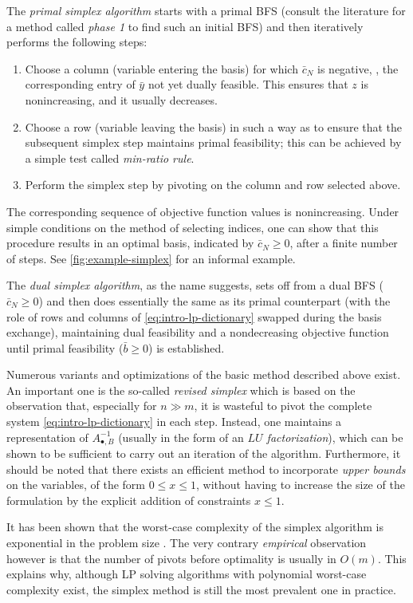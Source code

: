 The \emph{primal simplex algorithm} starts with a primal BFS (consult the literature for a method called \emph{phase 1} to find such an initial BFS) and then iteratively performs the following steps:
\begin{enumerate}
  \item Choose a column (variable entering the basis) for which $\bar c_N$ is negative, \ie, the corresponding entry of $\bar y$ not yet dually feasible. This ensures that $z$ is nonincreasing, and it usually decreases.
  \item Choose a row (variable leaving the basis) in such a way as to ensure that the subsequent simplex step maintains primal feasibility; this can be achieved by a simple test called \emph{min-ratio rule}.
  \item Perform the simplex step by pivoting on the column and row selected above.
\end{enumerate}  The corresponding sequence of objective function values is nonincreasing. Under simple conditions on the method of selecting indices, one can show that this procedure results in an optimal basis, indicated by $\bar c_N ≥ 0$, after a finite number of steps. See \cref{fig:example-simplex} for an informal example.

The \emph{dual simplex algorithm}, as the name suggests, sets off from a dual BFS ($\bar c_N ≥ 0$) and then does essentially the same as its primal counterpart (with the role of rows and columns of \cref{eq:intro-lp-dictionary} swapped during the basis exchange), maintaining dual feasibility and a nondecreasing objective function until primal feasibility ($\bar b ≥ 0$) is established.

Numerous variants and optimizations of the basic method described above exist. An important one is the so-called \emph{revised simplex} which is based on the observation that, especially for $n ≫ m$, it is wasteful to pivot the complete system \cref{eq:intro-lp-dictionary} in each step. Instead, one maintains a representation of $A_{•,B}^{-1}$ (usually in the form of an \emph{$LU$ factorization}), which can be shown to be sufficient to carry out an iteration of the algorithm. Furthermore, it should be noted that there exists an efficient method to incorporate \emph{upper bounds} on the variables, \eg of the form $0 ≤ x ≤ 1$, without having to increase the size of the formulation by the explicit addition of constraints $x ≤ 1$.

It has been shown that the worst-case complexity of the simplex algorithm is exponential in the problem size \cite{KleeMinty72Simplex}. The very contrary \emph{empirical} observation however is that the number of pivots before optimality is usually in $O(m)$. This explains why, although LP solving algorithms with polynomial worst-case complexity exist, the simplex method is still the most prevalent one in practice.
 
